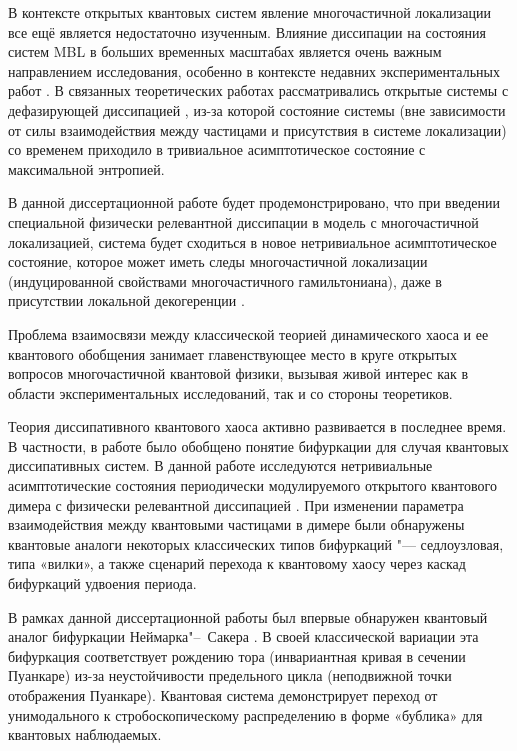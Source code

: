 В контексте открытых квантовых систем явление многочастичной локализации все ещё является недостаточно изученным. Влияние диссипации на состояния систем  MBL в больших временных масштабах является очень важным направлением исследования, особенно в контексте недавних экспериментальных работ \autocite{Schreiber2015, Choi2016, Bordia2017, Smith2016}. В связанных теоретических работах \autocite{Levi2016, Fischer2016, Medvedyeva2016} рассматривались открытые системы с дефазирующей диссипацией \autocite{Poletti2013}, из-за которой состояние системы (вне зависимости от силы взаимодействия между частицами и присутствия в системе локализации) со временем приходило в тривиальное асимптотическое состояние с максимальной энтропией.

В данной диссертационной работе будет продемонстрировано, что при введении специальной физически релевантной диссипации \autocite{Diehl2008} в модель с многочастичной локализацией, система будет сходиться в новое нетривиальное асимптотическое состояние, которое может иметь следы многочастичной локализации (индуцированной свойствами многочастичного гамильтониана), даже в присутствии локальной декогеренции \cite{Vakulchyk2018}.  
 
Проблема взаимосвязи между классической теорией динамического хаоса и ее квантового обобщения занимает главенствующее место в круге открытых вопросов многочастичной квантовой физики, вызывая живой интерес как в области экспериментальных исследований, так и со стороны теоретиков. 

Теория диссипативного квантового хаоса активно развивается в последнее время.
В частности, в работе \autocite{Ivanchenko2017} было обобщено понятие бифуркации для случая квантовых диссипативных систем. 
В данной работе исследуются нетривиальные асимптотические состояния периодически модулируемого открытого квантового димера с физически релевантной диссипацией \autocite{Diehl2008}.
При изменении параметра взаимодействия между квантовыми частицами в димере были обнаружены квантовые аналоги некоторых классических типов бифуркаций "--- седлоузловая, типа «вилки», а также сценарий перехода к квантовому хаосу через каскад бифуркаций удвоения периода.
 
В рамках данной диссертационной работы был впервые обнаружен квантовый аналог бифуркации Неймарка"--~Сакера \cite{Yusipov2019_1}. В своей классической вариации эта бифуркация соответствует рождению тора (инвариантная кривая в сечении Пуанкаре) из-за неустойчивости предельного цикла (неподвижной точки отображения Пуанкаре). Квантовая система демонстрирует переход от унимодального к стробоскопическому распределению в форме «бублика» для квантовых наблюдаемых.

